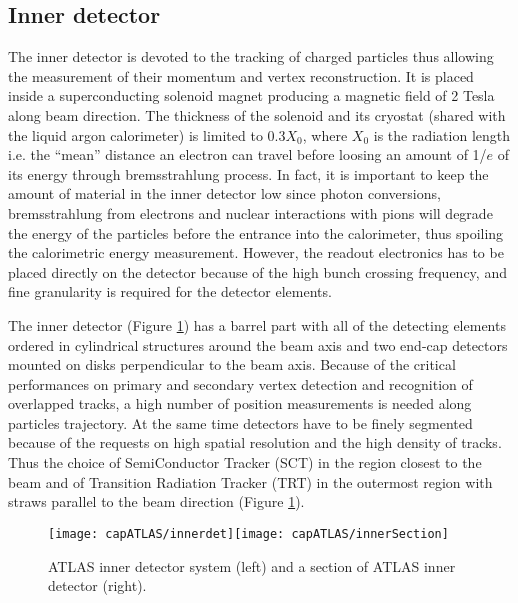 \subsection{Inner detector}
The inner detector is devoted to the tracking of charged particles thus allowing the measurement of their momentum and vertex reconstruction. It is placed inside a superconducting solenoid magnet producing a magnetic field of 2 Tesla along beam direction. The thickness of the solenoid and its cryostat (shared with the liquid argon calorimeter) is limited to $0.3X_{0}$, where $X_{0}$ is the radiation length i.e. the ``mean'' distance an electron can travel before loosing an amount of 1/$e$ of its energy through bremsstrahlung process. In fact, it is important to keep the amount of material in the inner detector low since photon conversions, bremsstrahlung from electrons and nuclear interactions with pions will degrade the energy of the particles before the entrance into the calorimeter, thus spoiling the  calorimetric energy measurement. However, the readout electronics has to be placed directly on the detector because of the high bunch crossing frequency, and fine granularity is required for the detector elements. %

The inner detector (Figure \ref{innerdet}) has a barrel part with all of the detecting elements ordered in cylindrical structures around the beam axis and two end-cap detectors mounted on disks perpendicular to the beam axis. Because of the critical performances on primary and secondary vertex detection and recognition of overlapped tracks, a high number of position measurements is needed along particles trajectory. At the same time detectors have to be finely segmented because of the requests on high spatial resolution and the high density of tracks. Thus the choice of SemiConductor Tracker (SCT) in the region closest to the beam and of Transition Radiation Tracker (TRT) in the outermost region with straws parallel to the beam direction (Figure \ref{innerdet}). \begin{figure}[htb]\begin{center}
\texttt{[image: capATLAS/innerdet]}\texttt{[image: capATLAS/innerSection]}\caption{ATLAS inner detector system (left) and a section of ATLAS inner detector (right). }\label{innerdet}
\end{center}\end{figure} 

